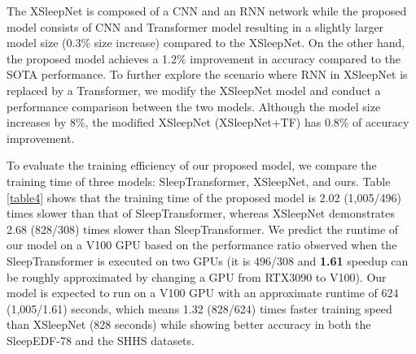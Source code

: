 
The XSleepNet is composed of a CNN and an RNN network while the proposed model consists of CNN and Transformer model resulting in a slightly larger model size (0.3\% size increase) compared to the XSleepNet. On the other hand, the proposed model achieves a 1.2\% improvement in accuracy compared to the SOTA performance. To further explore the scenario where RNN in XSleepNet is replaced by a Transformer, we modify the XSleepNet model and conduct a performance comparison between the two models. Although the model size increases by 8\%, the modified XSleepNet (XSleepNet+TF) has 0.8\% of accuracy improvement.

%

To evaluate the training efficiency of our proposed model, we compare the training time of three models: SleepTransformer, XSleepNet, and ours.
%
Table \ref{table4} shows that the training time of the proposed model is 2.02 (1,005/496) times slower than that of SleepTransformer, whereas XSleepNet demonstrates 2.68 (828/308) times slower than SleepTransformer.
We predict the runtime of our model on a V100 GPU based on the performance ratio observed when the SleepTransformer is executed on two GPUs (it is 496/308 and {\bf 1.61} speedup can be roughly approximated by changing a GPU from RTX3090 to V100). Our model is expected to run on a V100 GPU with an approximate runtime of 624 (1,005/1.61) seconds, which means 1.32 (828/624) times faster training speed than XSleepNet (828 seconds) while showing better accuracy in both the SleepEDF-78 and the SHHS datasets.



